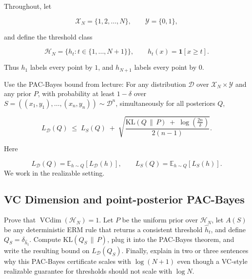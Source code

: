 \documentclass[11pt]{article}
\begin{document}
Throughout, let


\[
\mathcal{X}_N = \{1,2,\dots,N\}, \qquad \mathcal{Y} = \{0,1\},
\]


and define the threshold class


\[
\mathcal{H}_N = \{ h_t : t \in \{1,\dots, N+1\} \},
\qquad
h_t(x) = \mathbf{1}[x \ge t].
\]


Thus $h_1$ labels every point by $1$, and $h_{N+1}$ labels every point by $0$.

Use the PAC-Bayes bound from lecture: For any distribution $\mathcal{D}$ over 
$\mathcal{X}_N \times \mathcal{Y}$ and any prior $P$, with probability at least $1 - \delta$ 
over $S = ((x_1,y_1),\dots,(x_n,y_n)) \sim \mathcal{D}^n$, simultaneously for all posteriors $Q$,


\[
L_{\mathcal{D}}(Q)
\;\le\;
L_S(Q)
\;+\;
\sqrt{
\frac{
\mathrm{KL}(Q \,\|\, P)
\;+\;
\log\!\left(\frac{2n}{\delta}\right)
}{
2(n-1)
}
}.
\]



Here


\[
L_{\mathcal{D}}(Q) = \mathbb{E}_{h \sim Q}[L_{\mathcal{D}}(h)],
\qquad
L_S(Q) = \mathbb{E}_{h \sim Q}[L_S(h)].
\]
We work in the realizable setting.
\subsection{VC Dimension and point-posterior PAC-Bayes}
Prove that $\operatorname{VCdim}(\mathcal{H}_N) = 1$. Let $P$ be the uniform prior over 
$\mathcal{H}_N$, let $A(S)$ be any deterministic ERM rule that returns a consistent 
threshold $\hat{h}_t$, and define $Q_S = \delta_{\hat{h}_t}$. Compute 
$\mathrm{KL}(Q_S \,\|\, P)$, plug it into the PAC-Bayes theorem, and write the resulting 
bound on $L_{\mathcal{D}}(Q_S)$. Finally, explain in two or three sentences why this 
PAC-Bayes certificate scales with $\log(N+1)$ even though a VC-style realizable guarantee 
for thresholds should not scale with $\log N$.
\end{document}
